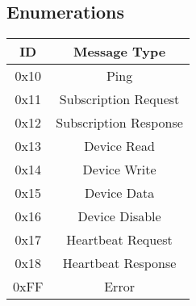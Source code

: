 \documentclass[12pt]{book}
\begin{document}
\subsection{Enumerations}
\begin{center}
    \begin{tabular}{|c|c|}
        \hline
        ID & Message Type \\
        \hline
        0x10 & Ping \\
        0x11 & Subscription Request \\
        0x12 & Subscription Response \\
        0x13 & Device Read \\
        0x14 & Device Write \\
        0x15 & Device Data \\
        0x16 & Device Disable \\
        0x17 & Heartbeat Request \\
        0x18 & Heartbeat Response \\
        0xFF & Error
        \hline
    \end{tabular}
\end{center}
\end{document}
